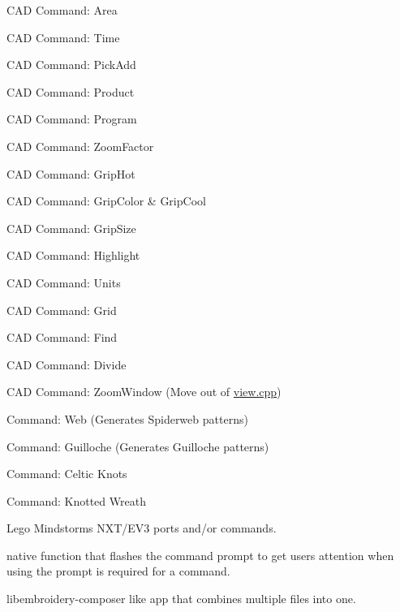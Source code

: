 \begin{DoxyRefList}
CAD Command\+: Area 



CAD Command\+: Time 



CAD Command\+: Pick\+Add 



CAD Command\+: Product 



CAD Command\+: Program 



CAD Command\+: Zoom\+Factor 



CAD Command\+: Grip\+Hot 



CAD Command\+: Grip\+Color \& Grip\+Cool 



CAD Command\+: Grip\+Size 



CAD Command\+: Highlight 



CAD Command\+: Units 



CAD Command\+: Grid 



CAD Command\+: Find 



CAD Command\+: Divide 



CAD Command\+: Zoom\+Window (Move out of \mbox{\hyperlink{view_8cpp}{view.\+cpp}}) 



Command\+: Web (Generates Spiderweb patterns) 



Command\+: Guilloche (Generates Guilloche patterns) 



Command\+: Celtic Knots 



Command\+: Knotted Wreath 



Lego Mindstorms NXT/\+EV3 ports and/or commands. 



native function that flashes the command prompt to get users attention when using the prompt is required for a command. 



libembroidery-\/composer like app that combines multiple files into one. 




\end{DoxyRefList}
